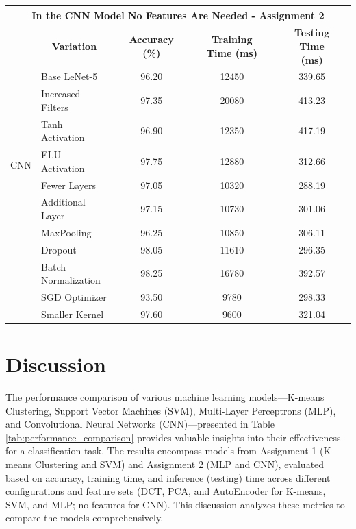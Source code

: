 \documentclass[a4paper,12pt]{article}
\begin{document}
\begin{table}[H]
{\begin{tabular}{l|l|l|ccc|ccc|ccc}
        \midrule
        \multicolumn{12}{c}{In the CNN Model No Features Are Needed - Assignment 2} \\
        \midrule
        \multirow{11}{*}{CNN} & \multicolumn{2}{c|}{\textbf{Variation}} & & \textbf{Accuracy (\%)} & &  &\textbf{Training Time (ms)} & & &\textbf{Testing Time (ms)} \\
        \cmidrule(lr){2-12}
        & \multicolumn{2}{l|}{Base LeNet-5}  & & 96.20 & & &12450 & & & 339.65 \\
        & \multicolumn{2}{l|}{Increased Filters} & & 97.35 & & & 20080 & & & 413.23 \\
        & \multicolumn{2}{l|}{Tanh Activation} & & 96.90 & & & 12350 & & & 417.19 \\
        & \multicolumn{2}{l|}{ELU Activation} & & 97.75 & & & 12880 & & & 312.66  \\
        & \multicolumn{2}{l|}{Fewer Layers} & & 97.05 & & & 10320 & & & 288.19 \\
        & \multicolumn{2}{l|}{Additional Layer} & & 97.15 & & & 10730 & & & 301.06 \\
        & \multicolumn{2}{l|}{MaxPooling} & & 96.25 & & & 10850 & & & 306.11 \\
        & \multicolumn{2}{l|}{Dropout} & & 98.05 & & & 11610 & & & 296.35  \\
        & \multicolumn{2}{l|}{Batch Normalization} & & 98.25 & & & 16780 & & & 392.57 \\
        & \multicolumn{2}{l|}{SGD Optimizer} & & 93.50 & & & 9780 & & & 298.33  \\
        & \multicolumn{2}{l|}{Smaller Kernel} & & 97.60 & & & 9600 & & & 321.04 \\
        \bottomrule
    \end{tabular}
    }
\end{table}
\section{Discussion}

The performance comparison of various machine learning models—K-means Clustering, Support Vector Machines (SVM), Multi-Layer Perceptrons (MLP), and Convolutional Neural Networks (CNN)—presented in Table \ref{tab:performance_comparison} provides valuable insights into their effectiveness for a classification task. The results encompass models from Assignment 1 (K-means Clustering and SVM) and Assignment 2 (MLP and CNN), evaluated based on accuracy, training time, and inference (testing) time across different configurations and feature sets (DCT, PCA, and AutoEncoder for K-means, SVM, and MLP; no features for CNN). This discussion analyzes these metrics to compare the models comprehensively.
\end{document}
